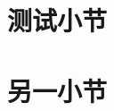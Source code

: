 \documentclass[fontset=fandol]{ctexart}
\begin{document}
\tableofcontents
\section{测试小节}
\section{另一小节}
\end{document}
